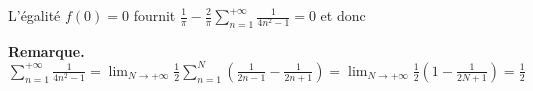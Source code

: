 {{\begin{enumerate}
L'égalité $f(0)=0$ fournit $\frac{1}{\pi}-\frac{2}{\pi}\sum_{n=1}^{+\infty}\frac{1}{4n^2-1}=0$ et donc

\begin{center}
\end{center}

\textbf{Remarque.} $\sum_{n=1}^{+\infty}\frac{1}{4n^2-1}=\lim_{N \rightarrow +\infty}\frac{1}{2}\sum_{n=1}^{N}\left(\frac{1}{2n-1}-\frac{1}{2n+1}\right)=\lim_{N \rightarrow +\infty}\frac{1}{2}\left(1-\frac{1}{2N+1}\right)=\frac{1}{2}$
\end{enumerate}}
}